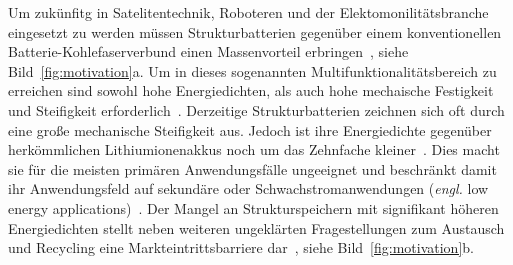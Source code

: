 
Um zukünfitg in Satelitentechnik, Roboteren und der Elektomonilitätsbranche eingesetzt zu werden müssen Strukturbatterien gegenüber einem konventionellen Batterie-Kohlefaserverbund einen Massenvorteil erbringen~\cite{Wong2007,Carlson2013}, siehe Bild~\ref{fig:motivation}a. Um in dieses sogenannten Multifunktionalitätsbereich zu erreichen sind sowohl hohe Energiedichten, als auch hohe mechaische Festigkeit und Steifigkeit erforderlich~\cite{Snyder2015}. Derzeitige Strukturbatterien zeichnen sich oft durch eine große mechanische Steifigkeit aus. Jedoch ist ihre Energiedichte gegenüber herkömmlichen Lithiumionenakkus noch um das Zehnfache kleiner~\cite{Asp2024}. Dies macht sie für die meisten primären Anwendungsfälle ungeeignet und beschränkt damit ihr Anwendungsfeld auf sekundäre oder Schwachstromanwendungen (\textit{engl.} low energy applications)~\cite{Snyder2006}. Der Mangel an Strukturspeichern mit signifikant höheren Energiedichten stellt neben weiteren ungeklärten Fragestellungen zum Austausch und Recycling eine Markteintrittsbarriere dar~\cite{Chen2024a}, siehe Bild~\ref{fig:motivation}b.

